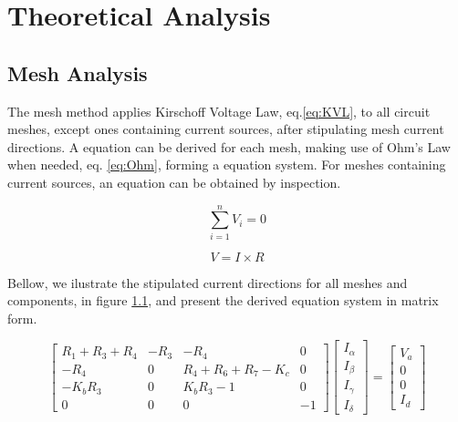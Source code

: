 \section{Theoretical Analysis}
\label{sec:analysis}

\subsection{Mesh Analysis}

\par The mesh method applies Kirschoff Voltage Law, eq.\ref{eq:KVL}, to all circuit meshes, except ones containing current sources, after stipulating mesh current directions. A equation can be derived for each mesh, making use of Ohm's Law when needed, eq. \ref{eq:Ohm}, forming a equation system. For meshes containing current sources, an equation can be obtained by inspection.

\begin{multicols}{2}
\begin{equation}
    \sum_{i=1}^{n} V_i = 0
    \label{eq:KVL}
\end{equation}

\begin{equation}
    V = I \times R
    \label{eq:Ohm}
\end{equation}
\end{multicols}

Bellow, we ilustrate the stipulated current directions for all meshes and components, in figure \ref{}, and present the derived equation system in matrix form.

\begin{equation*}
\begin{bmatrix} R_1+R_3+R_4 & -R_3 & -R_4 & 0 \\
 -R_4 & 0 & R_4+R_6+R_7-K_c & 0 \\
 -K_bR_3 & 0 & K_bR_3-1 & 0 \\
 0 & 0 & 0 & -1 \end{bmatrix} \begin{bmatrix} I_{\alpha}\\ I_{\beta}\\ I_{\gamma} \\ I_{\delta} \end{bmatrix} = \begin{bmatrix} V_a\\ 0\\ 0\\ I_d \end{bmatrix}
\end{equation*}

